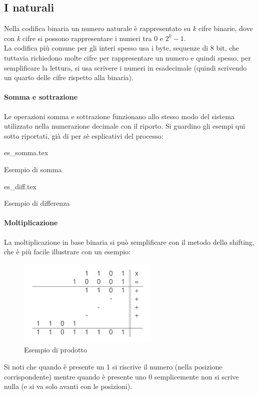 \documentclass[class=book, crop=false]{standalone}
\begin{document}
\subsection{I naturali} Nella codifica binaria un numero naturale è rappresentato su \emph{k} cifre binarie, dove con \emph{k} cifre si possono rappresentare i numeri tra 0 e $2^{k}-1$.\\
La codifica più comune per gli interi spesso usa i byte, sequenze di 8 bit, che tuttavia richiedono molte cifre per rappresentare un numero e quindi spesso, per semplificare la lettura, si usa scrivere i numeri in esadecimale (quindi scrivendo un quarto delle cifre rispetto alla binaria).

\paragraph*{Somma e sottrazione}
Le operazioni somma e sottrazione funzionano allo stesso modo del sistema utilizzato nella numerazione decimale con il riporto. Si guardino gli esempi qui sotto riportati, già di per sè esplicativi del processo:\\

\begin{table}[H]
	\centering
	{es_somma.tex}
	\caption{Esempio di somma}
\end{table}

\begin{table}[H]
	\centering
	{es_diff.tex}
	\caption{Esempio di differenza}
\end{table}

\paragraph*{Moltiplicazione} La moltiplicazione in base binaria si può semplificare con il metodo dello shifting, che è più facile illustrare con un esempio:
\begin{figure}[H]
	\centering
	\includegraphics[width=0.6\textwidth,keepaspectratio]{Moltiplicazione-Bin.png}
	\caption{Esempio di prodotto}
\end{figure}
Si noti che quando è presente un 1 si riscrive il numero (nella posizione corrispondente) mentre  quando è presente uno 0 semplicemente non si scrive nulla (e si va solo avanti con le posizioni).
\end{document}
